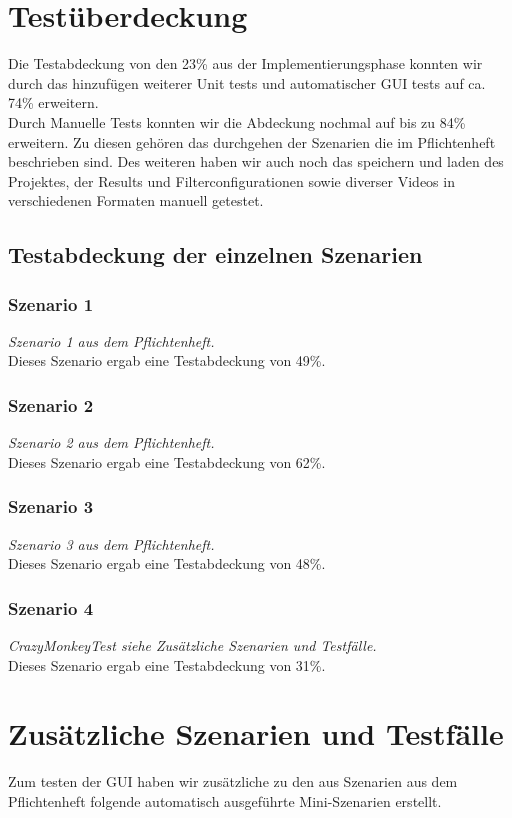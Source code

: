\documentclass{scrartcl}
\begin{document}
{\section{Testüberdeckung}
Die Testabdeckung von den 23\% aus der Implementierungsphase konnten wir durch das hinzufügen weiterer Unit tests und automatischer GUI tests auf ca. 74\% erweitern.\\
Durch Manuelle Tests konnten wir die Abdeckung nochmal auf bis zu 84\% erweitern. Zu diesen gehören das durchgehen der Szenarien die im Pflichtenheft beschrieben sind. Des weiteren haben wir auch noch das speichern und laden des Projektes, der Results und Filterconfigurationen sowie diverser Videos in verschiedenen Formaten manuell getestet.
\subsection{Testabdeckung der einzelnen Szenarien}
\subsubsection{Szenario 1}
\textit{Szenario 1 aus dem Pflichtenheft.}\\
Dieses Szenario ergab eine Testabdeckung von 49\%.
\subsubsection{Szenario 2}
\textit{Szenario 2 aus dem Pflichtenheft.}\\
Dieses Szenario ergab eine Testabdeckung von 62\%.
\subsubsection{Szenario 3}
\textit{Szenario 3 aus dem Pflichtenheft.}\\
Dieses Szenario ergab eine Testabdeckung von 48\%.
\subsubsection{Szenario 4}
\textit{CrazyMonkeyTest siehe Zusätzliche Szenarien und Testfälle.}\\
Dieses Szenario ergab eine Testabdeckung von 31\%.
\newpage
\section{Zusätzliche Szenarien und Testfälle}
Zum testen der GUI haben wir zusätzliche zu den aus Szenarien aus dem Pflichtenheft folgende automatisch ausgeführte Mini-Szenarien erstellt.
}
\end{document}
